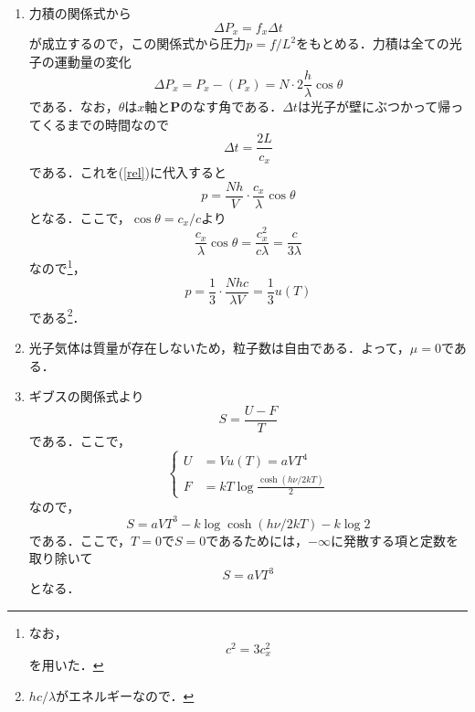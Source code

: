 \documentclass[a4paper,pdflatex,ja=standard]{bxjsarticle}
\begin{document}
\begin{enumerate}
  \item 
  力積の関係式から
  \begin{equation}
    \Delta P_{x}
    =
    f_{x}\Delta t
    \label{rel}
  \end{equation}
  が成立するので，この関係式から圧力$p=f/L^2$をもとめる．力積は全ての光子の運動量の変化
  \begin{equation}
    \Delta P_{x}
    =
    P_{x}-(P_{x})
    =
    N\cdot2\frac{h}{\lambda}\cos\theta
  \end{equation}
  である．なお，$\theta$は$x$軸と$\bm{P}$のなす角である．$\Delta t$は光子が壁にぶつかって帰ってくるまでの時間なので
  \begin{equation}
    \Delta t
    =
    \frac{2L}{c_{x}}
  \end{equation}
  である．これを(\ref{rel})に代入すると
  \begin{equation}
    p
    =
    \frac{Nh}{V}
    \cdot
    \frac{c_{x}}{\lambda}\cos\theta
  \end{equation}
  となる．ここで，$\cos\theta=c_{x}/c$より
  \begin{equation}
    \frac{c_{x}}{\lambda}\cos\theta
    =
    \frac{c_{x}^2}{c\lambda}
    =
    \frac{c}{3\lambda}
  \end{equation}
  なので\footnote{
    なお，
    $$
      c^2
      =
      3c_{x}^2
    $$
    を用いた．
  }，
  \begin{equation}
    p
    =
    \frac{1}{3}
    \cdot
    \frac{Nhc}{\lambda V}
    =
    \frac{1}{3}u(T)
  \end{equation}
  である\footnote{
    $hc/\lambda$がエネルギーなので．
  }．

  \item 
  光子気体は質量が存在しないため，粒子数は自由である．よって，$\mu=0$である．

  \item 
  ギブスの関係式より
  \begin{equation}
    S
    =
    \frac{U-F}{T}
  \end{equation}
  である．ここで，
  \begin{equation}
    \left\{
      \begin{alignedat}{1}
        U
        &=
        Vu(T)
        =
        aVT^{4}
        \\
        F
        &=
        kT\log\frac{\cosh(h\nu/2kT)}{2}
      \end{alignedat}
    \right.
  \end{equation}
  なので，
  \begin{equation}
    S
    =
    aVT^{3}
    -
    k\log\cosh(h\nu/2kT)
    -
    k\log 2
  \end{equation}
  である．ここで，$T=0$で$S=0$であるためには，$-\infty$に発散する項と定数を取り除いて
  \begin{equation}
    S
    =
    aVT^3
  \end{equation}
  となる．  

\end{enumerate}
\end{document}
